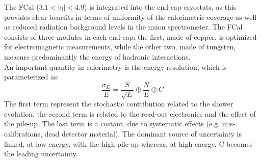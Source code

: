 The FCal ($\mathrm{3.1<|\eta|<4.9}$) is integrated into the end-cap cryostats, as this provides clear benefits in terms of uniformity of the calorimetric coverage as well as reduced radiation background levels in 
the muon spectrometer. The FCal consists of three modules in each end-cap: the first, made of copper, is optimized for electromagnetic measurements, while the other two, made of tungsten, measure 
predominantly the energy of hadronic interactions.\\
An important quantity in calorimetry is the energy resolution, which is parameterized as:
\begin{equation}
\frac{\sigma_{E}}{E}=\frac{S}{\sqrt{E}} \oplus \frac{N}{E} \oplus C
\end{equation}
The first term represent the stochastic contribution related to the shower evolution, the second term
is related to the read-out electronics and the effect of the pile-up. The last term is a costant, due to systematic effects (e.g. mis-calibrations, dead detector material). 
The dominant source of uncertainty is linked, at low energy, with the high pile-up whereas, at high energy, C becomes the leading uncertainty. 

\FloatBarrier
